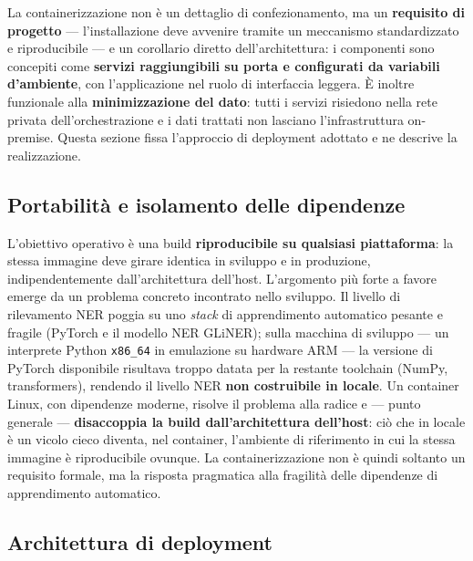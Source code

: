 La containerizzazione non è un dettaglio di confezionamento, ma un \textbf{requisito di progetto} --- l'installazione deve avvenire tramite un meccanismo standardizzato e riproducibile --- e un corollario diretto dell'architettura: i componenti sono concepiti come \textbf{servizi raggiungibili su porta e configurati da variabili d'ambiente}, con l'applicazione nel ruolo di interfaccia leggera. È inoltre funzionale alla \textbf{minimizzazione del dato}: tutti i servizi risiedono nella rete privata dell'orchestrazione e i dati trattati non lasciano l'infrastruttura on-premise. Questa sezione fissa l'approccio di deployment adottato e ne descrive la realizzazione.

\subsection{Portabilità e isolamento delle dipendenze}
\label{sub:container-portabilita}

L'obiettivo operativo è una build \textbf{riproducibile su qualsiasi piattaforma}: la stessa immagine deve girare identica in sviluppo e in produzione, indipendentemente dall'architettura dell'host. L'argomento più forte a favore emerge da un problema concreto incontrato nello sviluppo. Il livello di rilevamento NER poggia su uno \textit{stack} di apprendimento automatico pesante e fragile (PyTorch e il modello NER GLiNER); sulla macchina di sviluppo --- un interprete Python \texttt{x86\_64} in emulazione su hardware ARM --- la versione di PyTorch disponibile risultava troppo datata per la restante toolchain (NumPy, transformers), rendendo il livello NER \textbf{non costruibile in locale}. Un container Linux, con dipendenze moderne, risolve il problema alla radice e --- punto generale --- \textbf{disaccoppia la build dall'architettura dell'host}: ciò che in locale è un vicolo cieco diventa, nel container, l'ambiente di riferimento in cui la stessa immagine è riproducibile ovunque. La containerizzazione non è quindi soltanto un requisito formale, ma la risposta pragmatica alla fragilità delle dipendenze di apprendimento automatico.

\subsection{Architettura di deployment}
\label{sub:container-architettura}

